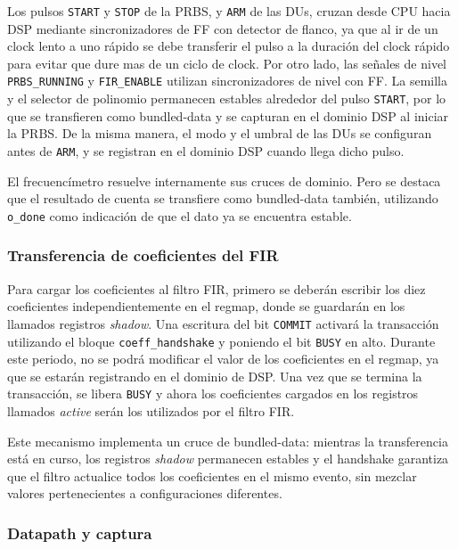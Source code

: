 \documentclass[10pt,a4paper]{article}
\begin{document}
Los pulsos \texttt{START} y \texttt{STOP} de la PRBS, y \texttt{ARM} de las
DUs, cruzan desde CPU hacia DSP mediante sincronizadores de FF con detector 
de flanco, ya que al ir de un clock lento a uno rápido se debe transferir el pulso
a la duración del clock rápido para evitar que dure mas de un ciclo de clock. 
Por otro lado, las señales de nivel \texttt{PRBS\_RUNNING} y \texttt{FIR\_ENABLE} 
utilizan sincronizadores de nivel con FF. La semilla y el selector de polinomio 
permanecen estables alrededor del pulso \texttt{START}, por lo que se transfieren 
como bundled-data y se capturan en el dominio DSP al iniciar la PRBS. De la misma 
manera, el modo y el umbral de las DUs se configuran antes de \texttt{ARM}, y se 
registran en el dominio DSP cuando llega dicho pulso.

El frecuencímetro resuelve internamente sus cruces de dominio. Pero se destaca 
que el resultado de cuenta se transfiere como bundled-data también, utilizando
\texttt{o\_done} como indicación de que el dato ya se encuentra estable.

\subsubsection*{Transferencia de coeficientes del FIR}

Para cargar los coeficientes al filtro FIR, primero se deberán escribir 
los diez coeficientes independientemente en el regmap, donde se guardarán en los 
llamados registros \emph{shadow}. Una escritura del bit \texttt{COMMIT} activará la 
transacción utilizando el bloque \texttt{coeff\_handshake} y poniendo el bit 
\texttt{BUSY} en alto. Durante este periodo, no se podrá modificar el valor de los 
coeficientes en el regmap, ya que se estarán registrando en el dominio de DSP.
Una vez que se termina la transacción, se libera \texttt{BUSY} y ahora los coeficientes
cargados en los registros llamados \emph{active} serán los utilizados por el filtro FIR.

Este mecanismo implementa un cruce de bundled-data: mientras la transferencia
está en curso, los registros \emph{shadow} permanecen estables y el handshake
garantiza que el filtro actualice todos los coeficientes en el mismo evento, sin
mezclar valores pertenecientes a configuraciones diferentes.

\subsubsection*{Datapath y captura}
\end{document}
